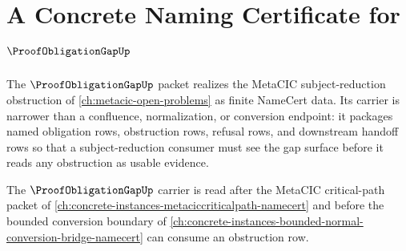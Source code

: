 \chapter{A Concrete Naming Certificate for $\ProofObligationGapUp$}
\label{ch:concrete-instances-proof-obligation-gap-namecert}

The $\ProofObligationGapUp$ packet realizes the MetaCIC subject-reduction obstruction of \autoref{ch:metacic-open-problems} as finite NameCert data. Its carrier is narrower than a confluence, normalization, or conversion endpoint: it packages named obligation rows, obstruction rows, refusal rows, and downstream handoff rows so that a subject-reduction consumer must see the gap surface before it reads any obstruction as usable evidence.



The $\ProofObligationGapUp$ carrier is read after the MetaCIC critical-path packet of \autoref{ch:concrete-instances-metaciccriticalpath-namecert} and before the bounded conversion boundary of \autoref{ch:concrete-instances-bounded-normal-conversion-bridge-namecert} can consume an obstruction row.

